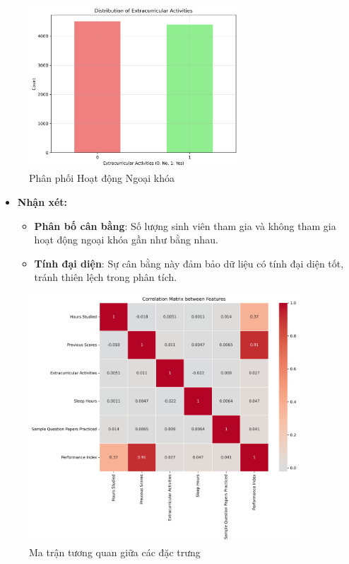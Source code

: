 \begin{figure}[H]
	\centering
	\includegraphics[width=0.7\textwidth]{imgs/figures/figure3_extracurricular_activities_distribution.png}
	\caption{Phân phối Hoạt động Ngoại khóa}
	\label{fig:extracurricular}
\end{figure}

\begin{itemize}
	\item \textbf{Nhận xét:}
	      \begin{itemize}
		      \item \textbf{Phân bố cân bằng}: Số lượng sinh viên tham gia và không tham gia hoạt động ngoại khóa gần như bằng nhau.
		      \item \textbf{Tính đại diện}: Sự cân bằng này đảm bảo dữ liệu có tính đại diện tốt, tránh thiên lệch trong phân tích.
	      \end{itemize}
\end{itemize}

\begin{figure}[H]
	\centering
	\includegraphics[width=0.9\textwidth]{imgs/figures/figure4_correlation_matrix.png}
	\caption{Ma trận tương quan giữa các đặc trưng}
	\label{fig:correlation}
\end{figure}

